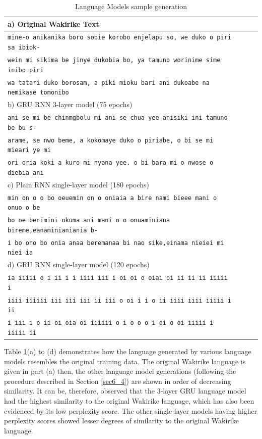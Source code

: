 \begin{table}
  \caption{Language Models sample generation}
  \label{tab6_2:Gen}
\begin{tabular}{lrrr}
\toprule
a) Original Wakirike Text \\
\midrule
\texttt{mine-o anikanika boro sobie korobo enjelapu so, we duko o piri sa ibiok-}\\
\texttt{wein mi sikima be jinye dukobia bo, ya tamuno worinime sime inibo piri} \\
\texttt{wa tatari duko borosam, a piki mioku bari ani dukoabe na nemikase tomonibo}\\
\midrule
b) GRU RNN 3-layer model (75 epochs) \\
\midrule
 \texttt{ani se mi be chinmgbolu mi ani se chua yee anisiki ini tamuno be bu s-}\\
\texttt{arame, se nwo beme, a kokomaye duko o piriabe, o bi se mi mieari ye mi} \\
\texttt{ori oria koki a kuro mi nyana yee. o bi bara mi o nwose o diebia  ani} \\
 \midrule
c) Plain RNN single-layer model (180 epochs) \\
\midrule
\texttt{min on o o bo oeuemin on o oniaia a bire nami bieee mani o onuo o be} \\
\texttt{bo oe berimini okuma ani mani o o onuaminiana bireme,eanaminianiania b-} \\
\texttt{i bo ono bo onia anaa beremanaa bi nao sike,einama nieiei mi niei ia } \\
\midrule
d) GRU RNN single-layer model (120 epochs) \\
\midrule
\texttt{ia iiiii  o i ii i i iiii  iii i oi oi o oiai  oi ii ii ii  iiiii  i} \\
\texttt{iiii iiiiii  iii iii iii  ii iii  o oi i i o ii iiii  iiii  iiiii i ii} \\
\texttt{i iii i o ii oi oia  oi iiiiii  o i o o o i oi o oi iiiii i iiiii  ii} \\
\bottomrule
\end{tabular}
\end{table}

Table \ref{tab6_2:Gen}(a) to (d) demonstrates how the language generated by various language models resembles the original training data.  The original Wakirike language is given in part (a) then, the other language model generations (following the procedure described in Section \ref{sec6_4}) are shown in order of decreasing similarity.  It can be, therefore, observed that the 3-layer GRU language model had the highest similarity to the original Wakirike language, which has also been evidenced by its low perplexity score.  The other single-layer models having higher perplexity scores showed lesser degrees of similarity to the original Wakirike language.

